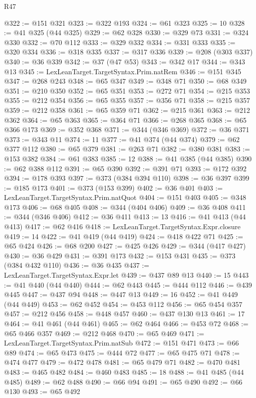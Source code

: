\begin{lexlean}{R47}
\begin{coremodule}
@322 := @151 @321
@323 := @322 @193
@324 := @61 @323
@325 := 10
@328 := @41 @325 (@44 @325)
@329 := @62 @328
@330 := @329 @73
@331 := @324 @330
@332 := @70 @112
@333 := @329 @332
@334 := @331 @333
@335 := @320 @334
@336 := @318 @335
@337 := @317 @336
@339 := @208 (@303 @337)
@340 := @36 @339
@342 := @37 (@47 @53)
@343 := @342 @17
@344 := @343 @13
@345 := LexLeanTarget.TargetSyntax.Prim.natRem
@346 := @151 @345
@347 := @268 @243
@348 := @65 @347
@349 := @348 @71
@350 := @68 @349
@351 := @210 @350
@352 := @65 @351
@353 := @272 @71
@354 := @215 @353
@355 := @212 @354
@356 := @65 @355
@357 := @356 @71
@358 := @215 @357
@359 := @212 @358
@361 := @65 @359 @71
@362 := @215 @361
@363 := @212 @362
@364 := @65 @363
@365 := @364 @71
@366 := @268 @365
@368 := @65 @366 @173
@369 := @352 @368
@371 := @344 (@346 @369)
@372 := @36 @371
@373 := @343 @11
@374 := 11
@377 := @41 @374 (@44 @374)
@379 := @62 @377 @112
@380 := @65 @379
@381 := @263 @71
@382 := @380 @381
@383 := @153 @382
@384 := @61 @383
@385 := 12
@388 := @41 @385 (@44 @385)
@390 := @62 @388 @112
@391 := @65 @390
@392 := @391 @71
@393 := @172 @392
@394 := @178 @393
@397 := @373 (@384 @394 @110)
@398 := @36 @397
@399 := @185 @173
@401 := @373 (@153 @399)
@402 := @36 @401
@403 := LexLeanTarget.TargetSyntax.Prim.natQuot
@404 := @151 @403
@405 := @348 @173
@406 := @68 @405
@408 := @344 (@404 @406)
@409 := @36 @408
@411 := @344 (@346 @406)
@412 := @36 @411
@413 := 13
@416 := @41 @413 (@44 @413)
@417 := @62 @416
@418 := LexLeanTarget.TargetSyntax.Expr.closure
@419 := 14
@422 := @41 @419 (@44 @419)
@424 := @418 @422 @71
@425 := @65 @424
@426 := @68 @200
@427 := @425 @426
@429 := @344 (@417 @427)
@430 := @36 @429
@431 := @391 @173
@432 := @153 @431
@435 := @373 (@384 @432 @110)
@436 := @36 @435
@437 := LexLeanTarget.TargetSyntax.Expr.let
@439 := @437 @89 @13
@440 := 15
@443 := @41 @440 (@44 @440)
@444 := @62 @443
@445 := @444 @112
@446 := @439 @445
@447 := @437 @94
@448 := @447 @13
@449 := 16
@452 := @41 @449 (@44 @449)
@453 := @62 @452
@454 := @453 @112
@456 := @65 @454 @357
@457 := @212 @456
@458 := @448 @457
@460 := @437 @130 @13
@461 := 17
@464 := @41 @461 (@44 @461)
@465 := @62 @464
@466 := @453 @72
@468 := @65 @466 @357
@469 := @212 @468
@470 := @65 @469
@471 := LexLeanTarget.TargetSyntax.Prim.natSub
@472 := @151 @471
@473 := @66 @89
@474 := @65 @473
@475 := @444 @72
@477 := @65 @475 @71
@478 := @474 @477
@479 := @472 @478
@481 := @65 @479 @71
@482 := @470 @481
@483 := @465 @482
@484 := @460 @483
@485 := 18
@488 := @41 @485 (@44 @485)
@489 := @62 @488
@490 := @66 @94
@491 := @65 @490
@492 := @66 @130
@493 := @65 @492

\end{coremodule}
\end{lexlean}
